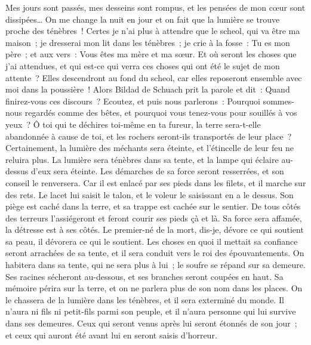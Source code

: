 \begin{multicols}{2}
Mes jours sont passés, mes desseins sont rompus, et les pensées de mon cœur sont dissipées… 
On me change la nuit en jour et on fait que la lumière se trouve proche des ténèbres~! 
Certes je n'ai plus à attendre que le scheol, qui va être ma maison~; je dresserai mon lit dans les ténèbres~;
je crie à la fosse~: Tu es mon père~; et aux vers~: Vous êtes ma mère et ma sœur. 
Et où seront les choses que j'ai attendues, et qui est-ce qui verra ces choses qui ont été le sujet de mon attente~?
Elles descendront au fond du scheol, car elles reposeront ensemble avec moi dans la poussière~! 
\VerseOne{}Alors Bildad de Schuach prit la parole et dit~:
Quand finirez-vous ces discours~? Ecoutez, et puis nous parlerons~:
Pourquoi sommes-nous regardés comme des bêtes, et pourquoi vous tenez-vous pour souillés à vos yeux~?
Ô toi qui te déchires toi-même en ta fureur, la terre sera-t-elle abandonnée à cause de toi, et les rochers seront-ils transportés de leur place~? 
Certainement, la lumière des méchants sera éteinte, et l'étincelle de leur feu ne reluira plus.
La lumière sera ténèbres dans sa tente, et la lampe qui éclaire au-dessus d'eux sera éteinte.
Les démarches de sa force seront resserrées, et son conseil le renversera.
Car il est enlacé par ses pieds dans les filets, et il marche sur des rets.
Le lacet lui saisit le talon, et le voleur le saisissant en a le dessus. 
Son piège est caché dans la terre, et sa trappe est cachée sur le sentier. 
De tous côtés des terreurs l'assiégeront et feront courir ses pieds çà et là.
Sa force sera affamée, la détresse est à ses côtés.
Le premier-né de la mort, dis-je, dévore ce qui soutient sa peau, il dévorera ce qui le soutient. 
 Les choses en quoi il mettait sa confiance seront arrachées de sa tente, et il sera conduit vers le roi des épouvantements. 
On habitera dans sa tente, qui ne sera plus à lui~; le soufre se répand sur sa demeure. 
Ses racines sécheront au-dessous, et ses branches seront coupées en haut. 
Sa mémoire périra sur la terre, et on ne parlera plus de son nom dans les places.
On le chassera de la lumière dans les ténèbres, et il sera exterminé du monde. 
Il n'aura ni fils ni petit-fils parmi son peuple, et il n'aura personne qui lui survive dans ses demeures. 
Ceux qui seront venus après lui seront étonnés de son jour~; et ceux qui auront été avant lui en seront saisis d'horreur. 

\end{multicols}
